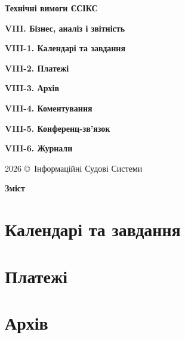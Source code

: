 \documentclass{article}
\newcommand\HUGE[1]{\fontsize{40}{40}\selectfont #1}
\begin{document}
\pagestyle{fancy}

\begin{titlepage}
  \AddToShipoutPictureBG*{\AtPageLowerLeft{\color{nato}\rule{\paperwidth}{\paperheight}}}
  \color{white}\thispagestyle{empty}\vspace*{4cm}\centering
  {\Huge  \textbf{Технічні вимоги ЄСІКС} \par} \vspace{2cm}
  {\HUGE  \textbf{VIII. Бізнес, аналіз і звітність} \par} \vspace{2.5cm}
  {\LARGE \textbf{VIII-1. Календарі та завдання} \par}
  {\LARGE \textbf{VIII-2. Платежі} \par}
  {\LARGE \textbf{VIII-3. Архів} \par}
  {\LARGE \textbf{VIII-4. Коментування} \par}
  {\LARGE \textbf{VIII-5. Конференц-зв'язок} \par}
  {\LARGE \textbf{VIII-6. Журнали} \par} \vspace{2.5cm}
  \vfill
  {\large 2026 \copyright\ Інформаційні Судові Системи \par}
\end{titlepage}

\newpage

\begin{center}
  {\Huge\color{nato}\bfseries Зміст\par}
\end{center}
\vspace{40pt}
\tableofcontents

\begin{abstract}
ТЕХНІЧНІ ВИМОГИ
НА СТВОРЕННЯ ЗАСОБУ ІНФОРМАТИЗАЦІЇ - КОМПОНЕНТІВ “БІЗНЕС, АНАЛІЗ І ЗВІТНІСТЬ”
ЄДИНОЇ СУДОВОЇ ІНФОРМАЦІЙНО-КОМУНІКАЦІЙНОЇ СИСТЕМИ.
\end{abstract}

\newpage

\section{Календарі та завдання}

\section{Платежі}

\section{Архів}
\end{document}
